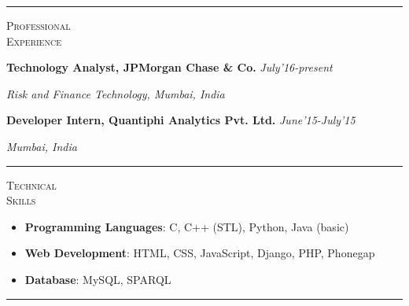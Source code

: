 \documentclass[11pt,a4paper]{article}
\newcommand{\bspace}{\vspace{4.0mm}} %
\newcommand{\ispace}{\vspace{1.8mm}} %
\begin{document}
	\bspace
	\hrule
	\bspace
	
	
	\begin{minipage}[t]{0.2\textwidth}
		\textsc{Professional\\Experience} 
	\end{minipage}
	\begin{minipage}[t]{0.8\textwidth}
		\textbf{Technology Analyst, JPMorgan Chase \& Co.} \hfill \textit{July'16-present}
		
		\textit{Risk and Finance Technology, Mumbai, India}
		
		\ispace
		
		\textbf{Developer Intern, Quantiphi Analytics Pvt. Ltd.} \hfill \textit{June'15-July'15}
		
		\textit{Mumbai, India}
	\end{minipage}
	
	\bspace
	\hrule
	\bspace
	
	\begin{minipage}[t]{0.2\textwidth}
		\textsc{Technical\\Skills} 
	\end{minipage}
	\begin{minipage}[t]{0.8\textwidth}
		\begin{itemize}[noitemsep, leftmargin=*]
			\item \textbf{Programming Languages}: C, C++ (STL), Python, Java (basic)
			\item \textbf{Web Development}: HTML, CSS, JavaScript, Django, PHP, Phonegap
			\item \textbf{Database}: MySQL, SPARQL
		\end{itemize}
	\end{minipage}
	
	\bspace
	\hrule
	\bspace
	
\end{document}
